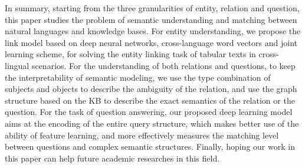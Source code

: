 \begin{englishabstract}
In summary, starting from the three granularities of entity, relation and question,
this paper studies the problem of semantic understanding and matching
between natural languages and knowledge bases.
For entity understanding, we propose the link model based on 
deep neural networks, cross-language word vectors and joint learning scheme,
for solving the entity linking task of tabular texts in cross-lingual scenarios.
For the understanding of both relations and questions, 
to keep the interpretability of semantic modeling, 
we use the type combination of subjects and objects to describe the ambiguity of the relation,
and use the graph structure based on the KB to describe
the exact semantics of the relation or the question.
For the task of question answering, our proposed deep learning model
aims at the encoding of the entire query structure,
which makes better use of the ability of feature learning,
and more effectively measures the matching level 
between questions and complex semantic structures.
Finally, hoping our work in this paper can help future academic researches in this field.

\end{englishabstract}

